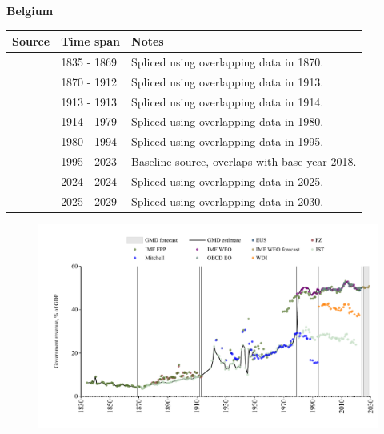 \documentclass[12pt,a4paper,landscape]{article}
\begin{document}
\begin{adjustbox}{max totalsize={\paperwidth}{\paperheight},center}
\begin{minipage}[t][\textheight][t]{\textwidth}
\vspace*{0.5cm}
{}
\begin{center}
{\Large\bfseries Belgium}
\end{center}
\vspace{0.5cm}
\begin{table}[H]
\centering
\small
\begin{tabular}{|l|l|l|}
\hline
\textbf{Source} & \textbf{Time span} & \textbf{Notes} \\
\hline
\rowcolor{white}\cite{IMF_FPP}& 1835 - 1869 &Spliced using overlapping data in 1870.\\
\rowcolor{lightgray}\cite{JST}& 1870 - 1912 &Spliced using overlapping data in 1913.\\
\rowcolor{white}\cite{IMF_FPP}& 1913 - 1913 &Spliced using overlapping data in 1914.\\
\rowcolor{lightgray}\cite{JST}& 1914 - 1979 &Spliced using overlapping data in 1980.\\
\rowcolor{white}\cite{IMF_WEO}& 1980 - 1994 &Spliced using overlapping data in 1995.\\
\rowcolor{lightgray}\cite{OECD_EO}& 1995 - 2023 &Baseline source, overlaps with base year 2018.\\
\rowcolor{white}\cite{EUS}& 2024 - 2024 &Spliced using overlapping data in 2025.\\
\rowcolor{lightgray}\cite{IMF_WEO_forecast}& 2025 - 2029 &Spliced using overlapping data in 2030.\\
\hline
\end{tabular}
\end{table}
\begin{figure}[H]
\centering
\includegraphics[width=\textwidth,height=0.6\textheight,keepaspectratio]{graphs/BEL_govrev_GDP.pdf}
\end{figure}
\end{minipage}
\end{adjustbox}
\end{document}
